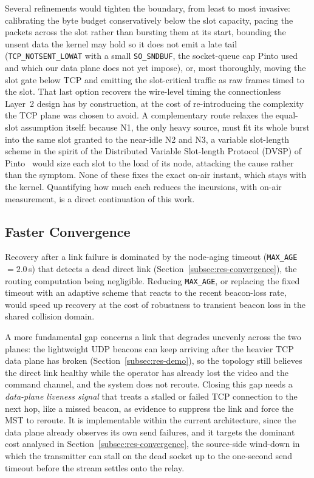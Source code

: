 Several refinements would tighten the boundary, from least to most invasive:
calibrating the byte budget conservatively below the slot capacity, pacing the
packets across the slot rather than bursting them at its start, bounding the
unsent data the kernel may hold so it does not emit a late tail
(\texttt{TCP\_NOTSENT\_LOWAT} with a small \texttt{SO\_SNDBUF}, the socket-queue
cap Pinto used and which our data plane does not yet impose), or, most thoroughly,
moving the slot gate below TCP and emitting the slot-critical traffic as raw frames
timed to the slot. That last option recovers the wire-level timing the
connectionless Layer~2 design has by construction, at the cost of re-introducing
the complexity the TCP plane was chosen to avoid. A complementary route relaxes
the equal-slot assumption itself: because N1, the only heavy source, must fit its
whole burst into the same slot granted to the near-idle N2 and N3, a variable
slot-length scheme in the spirit of the Distributed Variable Slot-length Protocol
(DVSP) of Pinto~\cite{ramos2018aerial} would size each slot to the load of its
node, attacking the cause rather than the symptom. None of these fixes the exact
on-air instant, which stays with the kernel. Quantifying how much each reduces the
incursions, with on-air measurement, is a direct continuation of this work.

\subsection{Faster Convergence}
\label{subsec:fw-convergence}

Recovery after a link failure is dominated by the node-aging timeout
(\texttt{MAX\_AGE} $= 2.0$\,s) that detects a dead direct link
(Section~\ref{subsec:res-convergence}), the routing computation being negligible.
Reducing \texttt{MAX\_AGE}, or replacing the fixed timeout with an adaptive scheme
that reacts to the recent beacon-loss rate, would speed up recovery at the cost of
robustness to transient beacon loss in the shared collision domain.

A more fundamental gap concerns a link that degrades unevenly across the two
planes: the lightweight UDP beacons can keep arriving after the heavier TCP data
plane has broken (Section~\ref{subsec:res-demo}), so the topology still believes
the direct link healthy while the operator has already lost the video and the
command channel, and the system does not reroute. Closing this gap needs a
\emph{data-plane liveness signal} that treats a stalled or failed TCP connection
to the next hop, like a missed beacon, as evidence to suppress the link and force
the MST to reroute. It is implementable within the current architecture, since the
data plane already observes its own send failures, and it targets the dominant
cost analysed in Section~\ref{subsec:res-convergence}, the source-side wind-down
in which the transmitter can stall on the dead socket up to the one-second send
timeout before the stream settles onto the relay.

